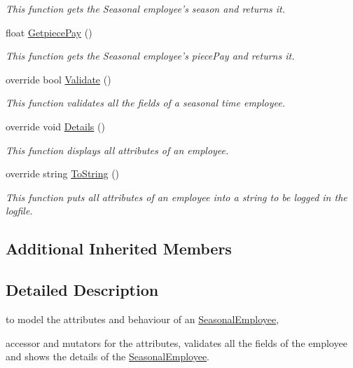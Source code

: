 \begin{DoxyCompactItemize}
\begin{DoxyCompactList}\small\item\em This function gets the Seasonal employee's season and returns it. \end{DoxyCompactList}\item 
float \hyperlink{class_all_employees_1_1_seasonal_employee_a96437aaaa4762ea0977ae1505f975e6c}{Getpiece\-Pay} ()
\begin{DoxyCompactList}\small\item\em This function gets the Seasonal employee's piece\-Pay and returns it. \end{DoxyCompactList}\item 
override bool \hyperlink{class_all_employees_1_1_seasonal_employee_a8f6b93b424b5cc1c6e88751e9ee3eac9}{Validate} ()
\begin{DoxyCompactList}\small\item\em This function validates all the fields of a seasonal time employee. \end{DoxyCompactList}\item 
override void \hyperlink{class_all_employees_1_1_seasonal_employee_a1bbd36c3a4e6be08fca3c31168336593}{Details} ()
\begin{DoxyCompactList}\small\item\em This function displays all attributes of an employee. \end{DoxyCompactList}\item 
override string \hyperlink{class_all_employees_1_1_seasonal_employee_a797da83b3ef0a5e7fb04fc5b0d373a11}{To\-String} ()
\begin{DoxyCompactList}\small\item\em This function puts all attributes of an employee into a string to be logged in the logfile. \end{DoxyCompactList}\end{DoxyCompactItemize}
\subsection*{Additional Inherited Members}


\subsection{Detailed Description}
to model the attributes and behaviour of an \hyperlink{class_all_employees_1_1_seasonal_employee}{Seasonal\-Employee}, 

accessor and mutators for the attributes, validates all the fields of the employee and  shows the details of the \hyperlink{class_all_employees_1_1_seasonal_employee}{Seasonal\-Employee}. 

